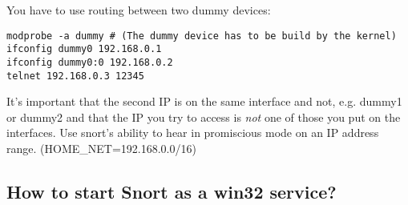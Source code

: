 \documentclass{article}
\begin{document}
You have to use routing between two dummy devices: 

\begin{verbatim}
modprobe -a dummy # (The dummy device has to be build by the kernel) 
ifconfig dummy0 192.168.0.1 
ifconfig dummy0:0 192.168.0.2  
telnet 192.168.0.3 12345 
\end{verbatim}

It's important that the second IP is on the same interface and not, e.g.
dummy1 or dummy2 and that the IP you try to access is {\em not} one of those you
put on the interfaces. Use snort's ability to hear in promiscious mode on an
IP address range. (HOME\_NET=192.168.0.0/16)

\subsection{How to start Snort as a win32 service? }
\end{document}
